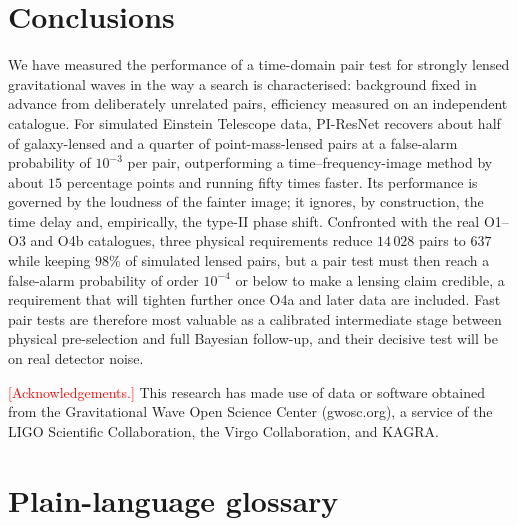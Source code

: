 \documentclass[aps,prd,twocolumn,superscriptaddress,nofootinbib,floatfix]{revtex4-2}
\newcommand{\TBD}[1]{\textcolor{red}{[#1]}}
\newcommand{\PIR}{PI-ResNet}
\begin{document}
\section{Conclusions}
\label{sec:conclusions}

We have measured the performance of a time-domain pair test for strongly lensed gravitational waves in the way a search is characterised: background fixed in advance from deliberately unrelated pairs, efficiency measured on an independent catalogue.
For simulated Einstein Telescope data, \PIR{} recovers about half of galaxy-lensed and a quarter of point-mass-lensed pairs at a false-alarm probability of $10^{-3}$ per pair, outperforming a time--frequency-image method by about $15$ percentage points and running fifty times faster.
Its performance is governed by the loudness of the fainter image; it ignores, by construction, the time delay and, empirically, the type-II phase shift.
Confronted with the real O1--O3 and O4b catalogues, three physical requirements reduce $14\,028$ pairs to $637$ while keeping $98\%$ of simulated lensed pairs, but a pair test must then reach a false-alarm probability of order $10^{-4}$ or below to make a lensing claim credible, a requirement that will tighten further once O4a and later data are included.
Fast pair tests are therefore most valuable as a calibrated intermediate stage between physical pre-selection and full Bayesian follow-up, and their decisive test will be on real detector noise.

\begin{acknowledgments}
\TBD{Acknowledgements.}
This research has made use of data or software obtained from the Gravitational Wave Open Science Center (gwosc.org), a service of the LIGO Scientific Collaboration, the Virgo Collaboration, and KAGRA.
\end{acknowledgments}

\appendix

\section{Plain-language glossary}
\label{app:glossary}
\end{document}
